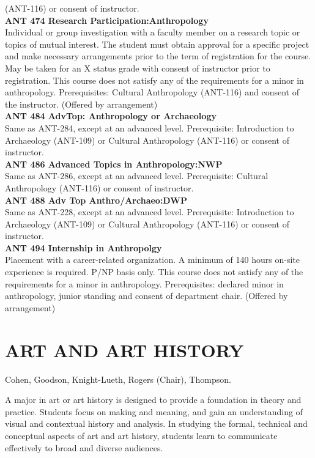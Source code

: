 \documentclass[
  letterpaper,
]{scrbook}
\begin{document}
(ANT-116) or consent of instructor.\\
\textbf{ANT 474 Research Participation:Anthropology}\\
Individual or group investigation with a faculty member on a research
topic or topics of mutual interest. The student must obtain approval for
a specific project and make necessary arrangements prior to the term of
registration for the course. May be taken for an X status grade with
consent of instructor prior to registration. This course does not
satisfy any of the requirements for a minor in anthropology.
Prerequisites: Cultural Anthropology (ANT-116) and consent of the
instructor. (Offered by arrangement)\\
\textbf{ANT 484 AdvTop: Anthropology or Archaeology}\\
Same as ANT-284, except at an advanced level. Prerequisite: Introduction
to Archaeology (ANT-109) or Cultural Anthropology (ANT-116) or consent
of instructor.\\
\textbf{ANT 486 Advanced Topics in Anthropology:NWP}\\
Same as ANT-286, except at an advanced level. Prerequisite: Cultural
Anthropology (ANT-116) or consent of instructor.\\
\textbf{ANT 488 Adv Top Anthro/Archaeo:DWP}\\
Same as ANT-228, except at an advanced level. Prerequisite: Introduction
to Archaeology (ANT-109) or Cultural Anthropology (ANT-116) or consent
of instructor.\\
\textbf{ANT 494 Internship in Anthropolgy}\\
Placement with a career-related organization. A minimum of 140 hours
on-site experience is required. P/NP basis only. This course does not
satisfy any of the requirements for a minor in anthropology.
Prerequisites: declared minor in anthropology, junior standing and
consent of department chair. (Offered by arrangement)

\section{ART AND ART HISTORY}\label{art-and-art-history}

Cohen, Goodson, Knight-Lueth, Rogers (Chair), Thompson.

A major in art or art history is designed to provide a foundation in
theory and practice. Students focus on making and meaning, and gain an
understanding of visual and contextual history and analysis. In studying
the formal, technical and conceptual aspects of art and art history,
students learn to communicate effectively to broad and diverse
audiences.
\end{document}
